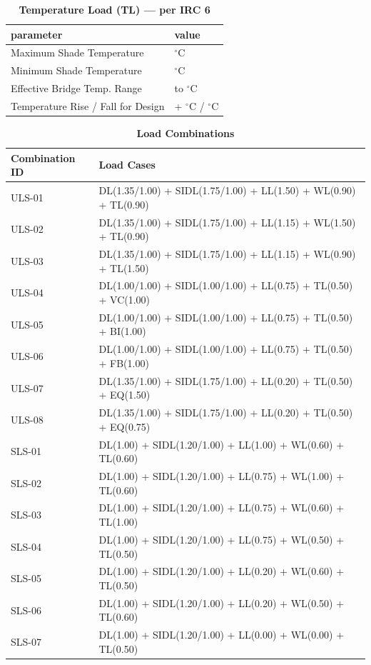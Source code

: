 \documentclass[12pt,a4paper]{report}
\numberwithin{table}{chapter}
\numberwithin{figure}{chapter}
\begin{document}
\vspace{1em}
\begin{longtable}{|L{5.5cm}|p{10.0cm}|}
\caption{\textbf{Temperature Load (TL) --- per IRC 6}}
\hline
\textbf{parameter} & \textbf{value} \\
\hline
\textnormal{Maximum Shade Temperature} &  $^\circ$C \\[6pt]
\hline
\textnormal{Minimum Shade Temperature} &  $^\circ$C \\[6pt]
\hline
\textnormal{Effective Bridge Temp. Range} &  to  $^\circ$C \\[6pt]
\hline
\textnormal{Temperature Rise / Fall for Design} & + $^\circ$C / \textminus{} $^\circ$C \\[6pt]
\hline
\end{longtable}

\vspace{1em}
\begin{longtable}{|C{4.0cm}|p{11.5cm}|}
\caption{\textbf{Load Combinations}}
\hline
\textbf{Combination ID} & \textbf{Load Cases} \\[6pt]
\hline
ULS-01 & DL(1.35/1.00) + SIDL(1.75/1.00) + LL(1.50) + WL(0.90) + TL(0.90) \\[6pt]
\hline
ULS-02 & DL(1.35/1.00) + SIDL(1.75/1.00) + LL(1.15) + WL(1.50) + TL(0.90) \\[6pt]
\hline
ULS-03 & DL(1.35/1.00) + SIDL(1.75/1.00) + LL(1.15) + WL(0.90) + TL(1.50) \\[6pt]
\hline
ULS-04 & DL(1.00/1.00) + SIDL(1.00/1.00) + LL(0.75) + TL(0.50) + VC(1.00) \\[6pt]
\hline
ULS-05 & DL(1.00/1.00) + SIDL(1.00/1.00) + LL(0.75) + TL(0.50) + BI(1.00) \\[6pt]
\hline
ULS-06 & DL(1.00/1.00) + SIDL(1.00/1.00) + LL(0.75) + TL(0.50) + FB(1.00) \\[6pt]
\hline
ULS-07 & DL(1.35/1.00) + SIDL(1.75/1.00) + LL(0.20) + TL(0.50) + EQ(1.50) \\[6pt]
\hline
ULS-08 & DL(1.35/1.00) + SIDL(1.75/1.00) + LL(0.20) + TL(0.50) + EQ(0.75) \\[6pt]
\hline
SLS-01 & DL(1.00) + SIDL(1.20/1.00) + LL(1.00) + WL(0.60) + TL(0.60) \\[6pt]
\hline
SLS-02 & DL(1.00) + SIDL(1.20/1.00) + LL(0.75) + WL(1.00) + TL(0.60) \\[6pt]
\hline
SLS-03 & DL(1.00) + SIDL(1.20/1.00) + LL(0.75) + WL(0.60) + TL(1.00) \\[6pt]
\hline
SLS-04 & DL(1.00) + SIDL(1.20/1.00) + LL(0.75) + WL(0.50) + TL(0.50) \\[6pt]
\hline
SLS-05 & DL(1.00) + SIDL(1.20/1.00) + LL(0.20) + WL(0.60) + TL(0.50) \\[6pt]
\hline
SLS-06 & DL(1.00) + SIDL(1.20/1.00) + LL(0.20) + WL(0.50) + TL(0.60) \\[6pt]
\hline
SLS-07 & DL(1.00) + SIDL(1.20/1.00) + LL(0.00) + WL(0.00) + TL(0.50) \\[6pt]
\hline
\end{longtable}
\end{document}
